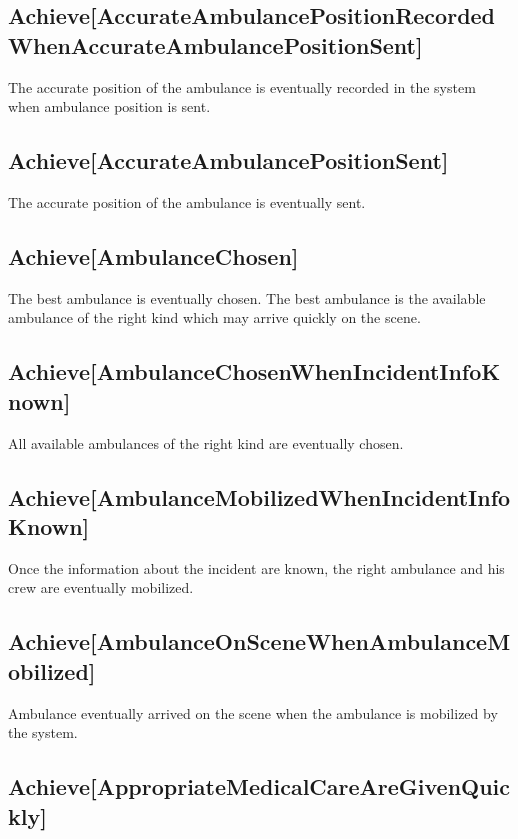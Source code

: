 \subsection{Achieve[AccurateAmbulancePositionRecordedWhenAccurateAmbulancePositionSent]}

The accurate position of the ambulance is eventually recorded in the system when ambulance position is sent.


\subsection{Achieve[AccurateAmbulancePositionSent]}

The accurate position of the ambulance is eventually sent.


\subsection{Achieve[AmbulanceChosen]}

The best ambulance is eventually chosen. The best ambulance is the available ambulance of the right kind which may arrive quickly on the scene.


\subsection{Achieve[AmbulanceChosenWhenIncidentInfoKnown]}

All available ambulances of the right kind are eventually chosen.


\subsection{Achieve[AmbulanceMobilizedWhenIncidentInfoKnown]}

Once the information about the incident are known, the right ambulance and his crew are eventually mobilized.


\subsection{Achieve[AmbulanceOnSceneWhenAmbulanceMobilized]}

Ambulance eventually arrived on the scene when the ambulance is mobilized by the system.


\subsection{Achieve[AppropriateMedicalCareAreGivenQuickly]}

